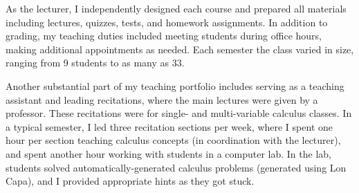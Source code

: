 \documentclass[a4paper,11pt]{article}
\begin{document}
% 


As the lecturer, I independently designed each course and prepared all materials including lectures, quizzes, tests, and homework assignments. In addition to grading, my teaching duties included meeting students during office hours, making additional appointments as needed. Each semester the class varied in size, ranging from 9 students to as many as 33. 

Another substantial part of my teaching portfolio includes serving as a teaching assistant and leading recitations, where the main lectures were given by a professor. These recitations were for single- and multi-variable calculus classes. In a typical semester, I led three recitation sections per week, where I spent one hour per section teaching calculus concepts (in coordination with the lecturer), and spent another hour working with students in a computer lab. In the lab, students solved automatically-generated calculus problems (generated using Lon Capa), and I provided appropriate hints as they got stuck.
\end{document}
